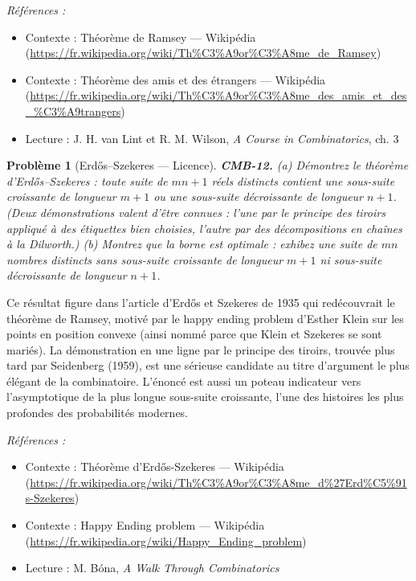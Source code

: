 \documentclass[11pt]{article}
\newtheorem{problem}{Problème}
\newenvironment{refs}{\par\small\noindent\emph{Références :}\begin{itemize}\setlength\itemsep{0pt}}{\end{itemize}\normalsize}
\begin{document}
\begin{refs}
\item Contexte : Théorème de Ramsey --- Wikipédia (\url{https://fr.wikipedia.org/wiki/Th%C3%A9or%C3%A8me_de_Ramsey})
\item Contexte : Théorème des amis et des étrangers --- Wikipédia (\url{https://fr.wikipedia.org/wiki/Th%C3%A9or%C3%A8me_des_amis_et_des_%C3%A9trangers})
\item Lecture : J. H. van Lint et R. M. Wilson, \textit{A Course in Combinatorics}, ch. 3
\end{refs}

\bigskip

\begin{problem}[{Erd\H{o}s--Szekeres --- Licence}]
\textbf{CMB-12.} (a) Démontrez le théorème d'Erd\H{o}s--Szekeres : toute suite de
$ mn + 1 $ réels distincts contient une sous-suite croissante de longueur $ m + 1 $ ou une
sous-suite décroissante de longueur $ n + 1 $. (Deux démonstrations valent d'être connues :
l'une par le principe des tiroirs appliqué à des étiquettes bien choisies, l'autre par des
décompositions en chaînes à la Dilworth.) (b) Montrez que la borne est optimale : exhibez une
suite de $ mn $ nombres distincts sans sous-suite croissante de longueur $ m+1 $ ni
sous-suite décroissante de longueur $ n+1 $.
\end{problem}

\noindent Ce résultat figure dans l'article d'Erd\H{o}s et Szekeres de 1935 qui redécouvrait
le théorème de Ramsey, motivé par le \og{} happy ending problem \fg{} d'Esther Klein sur les points en
position convexe (ainsi nommé parce que Klein et Szekeres se sont mariés). La démonstration en une
ligne par le principe des tiroirs, trouvée plus tard par Seidenberg (1959), est une sérieuse
candidate au titre d'argument le plus élégant de la combinatoire. L'énoncé est aussi un poteau
indicateur vers l'asymptotique de la plus longue sous-suite croissante, l'une des histoires les
plus profondes des probabilités modernes.

\begin{refs}
\item Contexte : Théorème d'Erd\H{o}s-Szekeres --- Wikipédia (\url{https://fr.wikipedia.org/wiki/Th%C3%A9or%C3%A8me_d%27Erd%C5%91s-Szekeres})
\item Contexte : Happy Ending problem --- Wikipédia (\url{https://fr.wikipedia.org/wiki/Happy_Ending_problem})
\item Lecture : M. Bóna, \textit{A Walk Through Combinatorics}
\end{refs}
\end{document}
